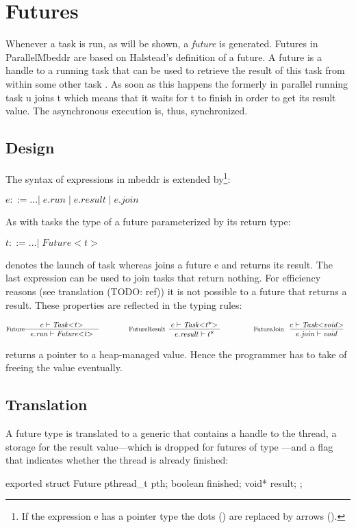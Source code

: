 \section{Futures}
Whenever a task  is run, as will be shown, a \textit{future} is generated. Futures in ParallelMbeddr are based on Halstead's definition of a future\cite{Halstead_Multilisp}. A future is a handle to a running task that can be used to retrieve the result of this task from within some other task . As soon as this happens the formerly in parallel running task u joins t which means that it waits for t to finish in order to get its result value. The asynchronous execution is, thus, synchronized.

\subsection{Design}
The syntax of expressions in mbeddr is extended by\footnote{If the expression e has a pointer type the dots () are replaced by arrows (\CODE{->}).}:

$ e ::= ...|\;e.\mathit{run}\;|\;e.\mathit{result}\;|\;e.\mathit{join} $

As with tasks the type of a future parameterized by its return type:

$ t ::= ...|\;\mathit{Future{<}t{>}}$

 denotes the launch of task  whereas  joins a future {e} and returns its result. The last expression  can be used to join tasks that return nothing. For efficiency reasons (see translation (TODO: ref)) it is not possible to  a future that returns a result. These properties are reflected in the typing rules:

\begin{center}
\begin{align*}
\inference*[Future]{e |- \mathit{Task{<}t{>}}}{e.\mathit{run} |- \mathit{Future{<}t{>}}}
\qquad\qquad
\inference*[FutureResult]{e |- \mathit{Task{<}t\text{*}{>}}}{e.\mathit{result} |- t\text{*}}
\qquad\qquad
\inference*[FutureJoin]{e |- \mathit{Task{<}void{>}}}{e.\mathit{join} |- \mathit{void}}
\end{align*}
\end{center}

 returns a pointer to a heap-managed value. Hence the programmer has to take of freeing the value eventually.

\subsection{Translation}
A future type  is translated to a generic  that contains a handle to the thread, a storage for the result value---which is dropped for futures of type ---and a flag that indicates whether the thread is already finished:
\begin{ccode}
exported struct Future { 
  pthread_t pth; 
  boolean finished; 
  void* result; 
};
\end{ccode}

